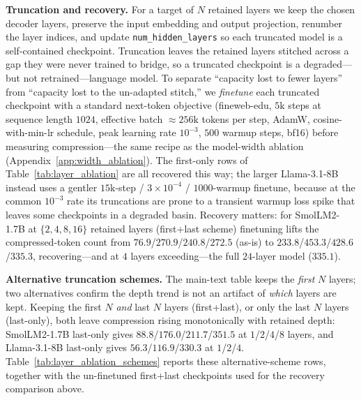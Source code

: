 \textbf{Truncation and recovery.} For a target of $N$ retained layers we keep the chosen decoder layers, preserve the input embedding and output projection, renumber the layer indices, and update \texttt{num\_hidden\_layers} so each truncated model is a self-contained checkpoint. Truncation leaves the retained layers stitched across a gap they were never trained to bridge, so a truncated checkpoint is a degraded---but not retrained---language model. To separate ``capacity lost to fewer layers'' from ``capacity lost to the un-adapted stitch,'' we \emph{finetune} each truncated checkpoint with a standard next-token objective (fineweb-edu, $5\mathrm{k}$ steps at sequence length $1024$, effective batch ${\approx}256\mathrm{k}$ tokens per step, AdamW, cosine-with-min-lr schedule, peak learning rate $10^{-3}$, $500$ warmup steps, bf16) before measuring compression---the same recipe as the model-width ablation (Appendix~\ref{app:width_ablation}). The first-only rows of Table~\ref{tab:layer_ablation} are all recovered this way; the larger Llama-3.1-8B instead uses a gentler $15\mathrm{k}$-step / $3\times10^{-4}$ / $1000$-warmup finetune, because at the common $10^{-3}$ rate its truncations are prone to a transient warmup loss spike that leaves some checkpoints in a degraded basin. Recovery matters: for SmolLM2-1.7B at $\{2,4,8,16\}$ retained layers (first+last scheme) finetuning lifts the compressed-token count from $76.9$/$270.9$/$240.8$/$272.5$ (as-is) to $233.8$/$453.3$/$428.6$/$335.3$, recovering---and at $4$ layers exceeding---the full $24$-layer model ($335.1$).

\textbf{Alternative truncation schemes.} The main-text table keeps the \emph{first} $N$ layers; two alternatives confirm the depth trend is not an artifact of \emph{which} layers are kept. Keeping the first $N$ \emph{and} last $N$ layers (first+last), or only the last $N$ layers (last-only), both leave compression rising monotonically with retained depth: SmolLM2-1.7B last-only gives $88.8$/$176.0$/$211.7$/$351.5$ at $1$/$2$/$4$/$8$ layers, and Llama-3.1-8B last-only gives $56.3$/$116.9$/$330.3$ at $1$/$2$/$4$. Table~\ref{tab:layer_ablation_schemes} reports these alternative-scheme rows, together with the un-finetuned first+last checkpoints used for the recovery comparison above.

\begin{table}[t]
    \centering
    \caption{Detailed transformer-depth cuts supporting the depth--size table (Table~\ref{tab:layer_ablation}). \emph{First+last}: SmolLM2-1.7B with the first $N$ and last $N$ decoder layers ($2N$ total), shown as-is and after causal-LM finetuning. \emph{Last-only}: SmolLM2-1.7B and Llama-3.1-8B with only the last $N$ layers (finetuned). Full-depth references are in Table~\ref{tab:layer_ablation}. ``Compressed Tokens'' is the achieved prefix length $n$, ``Trajectory Length'' is $L_{\text{traj}}$, and ``PCA 99\%'' is the number of principal components explaining 99\% of trajectory variance.}
    \label{tab:layer_ablation_schemes}
    \begin{small}
    
    \end{small}
\vskip -0.1in
\end{table}

